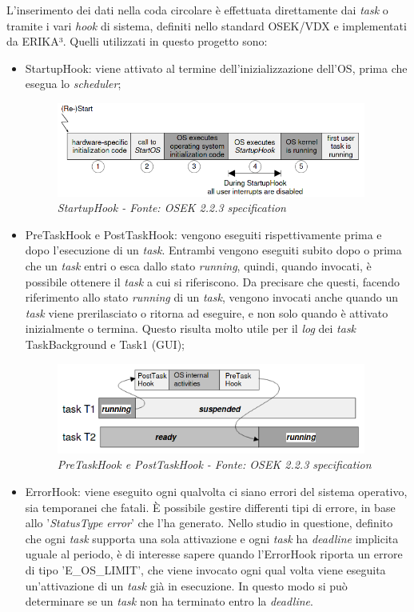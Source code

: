 \documentclass{article}
\begin{document}
L'inserimento dei dati nella coda circolare è effettuata direttamente dai \textit{task} o tramite i vari \textit{hook} di sistema, definiti nello standard OSEK/VDX e implementati da ERIKA³. Quelli utilizzati in questo progetto sono:
\begin{itemize}
	\item StartupHook: viene attivato al termine dell'inizializzazione dell'OS, prima che esegua lo \textit{scheduler};
	\begin{figure}[H]
		\centering
		\includegraphics[width=4in]{image/StartupHook.png}
		\caption{\textit{\textit{StartupHook} - Fonte: OSEK 2.2.3 specification}}
		\label{startup}
	\end{figure}
	\item PreTaskHook e PostTaskHook: vengono eseguiti rispettivamente prima e dopo l'esecuzione di un \textit{task}. Entrambi vengono eseguiti subito dopo o prima che un \textit{task} entri o esca dallo stato \textit{running}, quindi, quando invocati, è possibile ottenere il \textit{task} a cui si riferiscono. Da precisare che questi, facendo riferimento allo stato \textit{running} di un \textit{task}, vengono invocati anche quando un \textit{task} viene prerilasciato o ritorna ad eseguire, e non solo quando è attivato inizialmente o termina. Questo risulta molto utile per il \textit{log} dei \textit{task} TaskBackground e Task1 (GUI);
	\begin{figure}[H]
		\centering
		\includegraphics[width=4in]{image/PrePostTaskHook.png}
		\caption{\textit{\textit{PreTaskHook} e \textit{PostTaskHook} - Fonte: OSEK 2.2.3 specification}}
		\label{taskHook}
	\end{figure}
	\item ErrorHook: viene eseguito ogni qualvolta ci siano errori del sistema operativo, sia temporanei che fatali.  È possibile gestire differenti tipi di errore, in base allo '\textit{StatusType error}' che l'ha generato. Nello studio in questione, definito che ogni \textit{task} supporta una sola attivazione e ogni \textit{task} ha \textit{deadline} implicita uguale al periodo, è di interesse sapere quando l'ErrorHook riporta un errore di tipo 'E\_OS\_LIMIT', che viene invocato ogni qual volta viene eseguita un'attivazione di un \textit{task} già in esecuzione. In questo modo si può determinare se un \textit{task} non ha terminato entro la \textit{deadline}.
\end{itemize}
\end{document}

